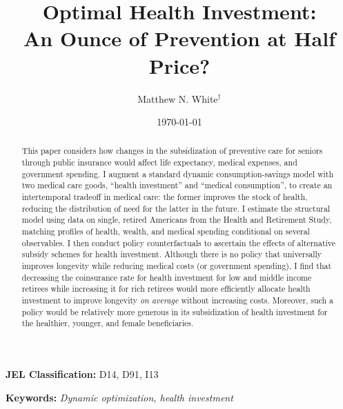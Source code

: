 \documentclass[12pt,pdftex,letterpaper]{article}
\begin{document}
\begin{singlespace}
\title{Optimal Health Investment:\\An Ounce of Prevention at Half Price?}

\author{Matthew N. White$^\dagger$}

\date{\today}

\maketitle

\begin{abstract}
This paper considers how changes in the subsidization of preventive care for seniors through public insurance would affect life expectancy, medical expenses, and government spending.  I augment a standard dynamic consumption-savings model with two medical care goods, ``health investment'' and ``medical consumption'', to create an intertemporal tradeoff in medical care: the former improves the stock of health, reducing the distribution of need for the latter in the future.  I estimate the structural model using data on single, retired Americans from the Health and Retirement Study, matching profiles of health, wealth, and medical spending conditional on several observables.  I then conduct policy counterfactuals to ascertain the effects of alternative subsidy schemes for health investment.  Although there is no policy that universally improves longevity while reducing medical costs (or government spending), I find that decreasing the coinsurance rate for health investment for low and middle income retirees while increasing it for rich retirees would more efficiently allocate health investment to improve longevity \textit{on average} without increasing costs.  Moreover, such a policy would be relatively more generous in its subsidization of health investment for the healthier, younger, and female beneficiaries.
\end{abstract}

\end{singlespace}

\textbf{JEL Classification:} D14, D91, I13

\vspace{0.5cm}

\textbf{Keywords:} \textit{Dynamic optimization, health investment}
\end{document}
